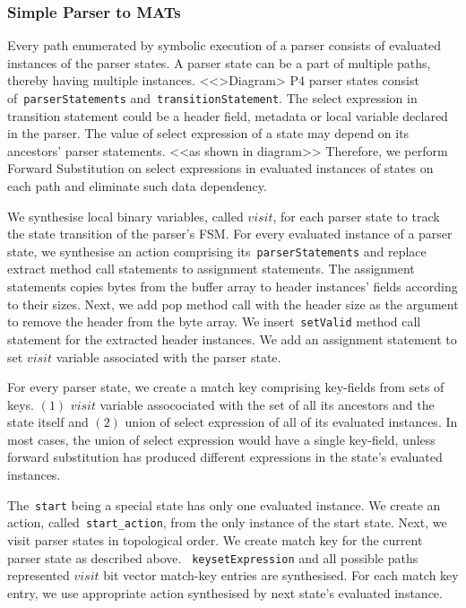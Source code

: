 \subsubsection{Simple Parser to MATs}
\label{subsubsection:simple-parser-to-mats}
Every path enumerated by symbolic execution of a parser consists of evaluated instances of the parser states.
A parser state can be a part of multiple paths, thereby having multiple instances.
<<>Diagram>
P4 parser states consist of~\texttt{parser\-Statements} and~\texttt{transition\-Statement}.
The select expression in transition statement could be a header field, metadata or local variable declared in the parser.
The value of select expression of a state may depend on its ancestors' parser statements. <<as shown in diagram>>
Therefore, we perform Forward Substitution on select expressions in evaluated instances of states
on each path and eliminate such data dependency.

We synthesise local binary variables, called $visit$, for each parser state to track the state transition of the parser's FSM.
For every evaluated instance of a parser state, we synthesise an action comprising its~\texttt{parser\-Statements} and replace extract method call statements to assignment statements.
The assignment statements copies bytes from the buffer array to header instances' fields according to their sizes.
Next, we add pop method call with the header size as the argument to remove the header from the byte array.
We insert~\texttt{setValid} method call statement for the extracted header instances.
We add an assignment statement to set $visit$ variable associated with the parser state.


For every parser state, we create a match key comprising key-fields from sets of keys. 
$(1)$ $visit$ variable assocociated with the set of all its ancestors and the state itself and
$(2)$ union of select expression of all of its evaluated instances.
In most cases, the union of select expression would have a single key-field, unless forward substitution has produced different expressions in the state's evaluated instances.

The~\texttt{start} being a special state has only one evaluated instance.
We create an action, called~\texttt{start\_action}, from the only instance of the start state.
Next, we visit parser states in topological order. 
We create match key for the current parser state as described above.
~\texttt{keysetExpression} and all possible paths represented $visit$ bit vector match-key entries are synthesised.
For each match key entry, we use appropriate action synthesised by next state's evaluated instance.

